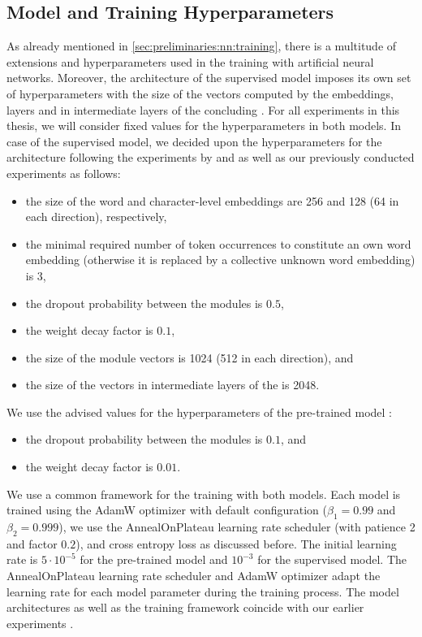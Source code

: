 \documentclass[../../document.tex]{subfiles}
\begin{document}
    \subsection*{Model and Training Hyperparameters}
    As already mentioned in \cref{sec:preliminaries:nn:training}, there is a multitude of extensions and hyperparameters used in the training with artificial neural networks.
    Moreover, the architecture of the supervised model imposes its own set of hyperparameters with the size of the vectors computed by the embeddings,  layers and in intermediate layers of the concluding .
    For all experiments in this thesis, we will consider fixed values for the hyperparameters in both models.
    In case of the supervised model, we decided upon the hyperparameters for the architecture following the experiments by \citet{Cor20} and \citet{StaSte20} as well as our previously conducted experiments \citep{RupMoe21,Rup22} as follows:
    \begin{itemize}
        \item the size of the word and character-level embeddings are 256 and 128 (64 in each direction), respectively,
        \item the minimal required number of token occurrences to constitute an own word embedding (otherwise it is replaced by a collective unknown word embedding) is 3,
        \item the dropout probability between the modules is \(0.5\),
        \item the weight decay factor is \(0.1\),
        \item the size of the  module vectors is 1024 (512 in each direction), and
        \item the size of the vectors in intermediate layers of the  is 2048.
    \end{itemize}
    We use the advised values for the hyperparameters of the pre-trained model \citep[cf.\@][]{Devlin2019}:
    \begin{itemize}
        \item the dropout probability between the modules is \(0.1\), and
        \item the weight decay factor is \(0.01\).
    \end{itemize}

    We use a common framework for the training with both models.
    Each model is trained using the AdamW optimizer with default configuration ($\beta_1 = 0.99$ and $\beta_2 = 0.999$), we use the AnnealOnPlateau learning rate scheduler (with patience 2 and factor \(0.2\)), and cross entropy loss as discussed before.
    The initial learning rate is \(5\cdot 10^{-5}\) for the pre-trained model and \(10^{-3}\) for the supervised model.
    The AnnealOnPlateau learning rate scheduler and AdamW optimizer adapt the learning rate for each model parameter during the training process.
    The model architectures as well as the training framework coincide with our earlier experiments \citep{RupMoe21,Rup22}.
\end{document}
